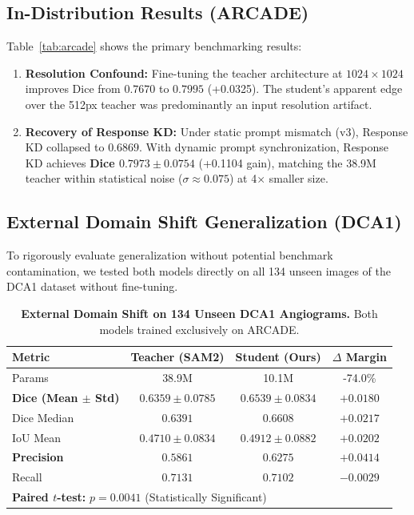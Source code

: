 \documentclass[10pt,twocolumn]{article}
\begin{document}
\subsection{In-Distribution Results (ARCADE)}

Table~\ref{tab:arcade} shows the primary benchmarking results:
\begin{enumerate}
    \item \textbf{Resolution Confound:} Fine-tuning the teacher architecture at $1024\times 1024$ improves Dice from $0.7670$ to $0.7995$ (+0.0325). The student's apparent edge over the 512px teacher was predominantly an input resolution artifact.
    \item \textbf{Recovery of Response KD:} Under static prompt mismatch (v3), Response KD collapsed to $0.6869$. With dynamic prompt synchronization, Response KD achieves \textbf{Dice $0.7973 \pm 0.0754$} (+0.1104 gain), matching the 38.9M teacher within statistical noise ($\sigma \approx 0.075$) at 4$\times$ smaller size.
\end{enumerate}

\subsection{External Domain Shift Generalization (DCA1)}

To rigorously evaluate generalization without potential benchmark contamination, we tested both models directly on all 134 unseen images of the DCA1 dataset without fine-tuning.

\begin{table}[h]
\centering
\footnotesize
\setlength{\tabcolsep}{2.2pt}
\caption{\textbf{External Domain Shift on 134 Unseen DCA1 Angiograms.} Both models trained exclusively on ARCADE.}
\label{tab:dca1}
\begin{tabular}{lccc}
\toprule
\textbf{Metric} & \textbf{Teacher (SAM2)} & \textbf{Student (Ours)} & \textbf{$\Delta$ Margin} \\
\midrule
Params & 38.9M & 10.1M & -74.0\% \\
\textbf{Dice (Mean $\pm$ Std)} & $0.6359 \pm 0.0785$ & $\mathbf{0.6539 \pm 0.0834}$ & $\mathbf{+0.0180}$ \\
Dice Median & $0.6391$ & $\mathbf{0.6608}$ & $+0.0217$ \\
IoU Mean & $0.4710 \pm 0.0834$ & $\mathbf{0.4912 \pm 0.0882}$ & $+0.0202$ \\
\textbf{Precision} & $0.5861$ & $\mathbf{0.6275}$ & $\mathbf{+0.0414}$ \\
Recall & $0.7131$ & $0.7102$ & $-0.0029$ \\
\midrule
\multicolumn{4}{l}{\textbf{Paired $t$-test:} $p = 0.0041$ (Statistically Significant)} \\
\bottomrule
\end{tabular}
\end{table}
\end{document}
